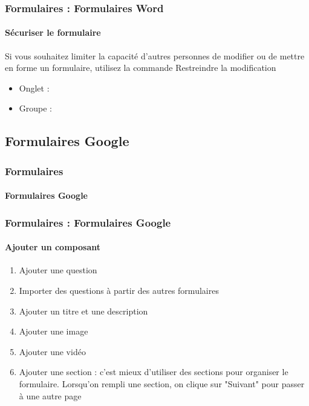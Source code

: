 \documentclass[xcolor=table]{beamer}
\begin{document}
\begin{frame}
\frametitle{Formulaires : Formulaires Word}
\framesubtitle{Sécuriser le formulaire}

Si vous souhaitez limiter la capacité d’autres personnes de modifier ou de mettre en forme un formulaire, utilisez la commande Restreindre la modification

\begin{itemize}
	\item Onglet : 
	\item Groupe : 
\end{itemize}

\end{frame}

\subsection{Formulaires Google}

\begin{frame}
\frametitle{Formulaires}
\framesubtitle{Formulaires Google}



\end{frame}

\begin{frame}[t]
\frametitle{Formulaires : Formulaires Google}
\framesubtitle{Ajouter un composant}

\begin{minipage}{.80\textwidth}
	\begin{enumerate}
		\item Ajouter une question 
		\item Importer des questions à partir des autres formulaires
		\item Ajouter un titre et une description
		\item Ajouter une image
		\item Ajouter une vidéo 
		\item Ajouter une section : c'est mieux d'utiliser des sections pour organiser le formulaire. Lorsqu'on rempli une section, on clique sur "Suivant" pour passer à une autre page
	\end{enumerate}
\end{minipage}
\begin{minipage}{.19\textwidth}
\end{minipage}

\end{frame}
\end{document}
